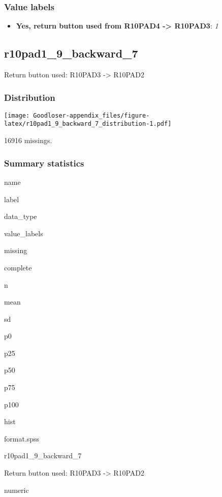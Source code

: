 \documentclass[]{book}
\providecommand{\tightlist}{%
  \setlength{\itemsep}{0pt}\setlength{\parskip}{0pt}}
\begin{document}
\subsubsection{Value labels}\label{r10pad1_9_backward_6_labels}

\begin{itemize}
\tightlist
\item
  \textbf{Yes, return button used from R10PAD4 -\textgreater{} R10PAD3}:
  \emph{1}
\end{itemize}

\subsection{r10pad1\_9\_backward\_7}\label{r10pad1_9_backward_7}

Return button used: R10PAD3 -\textgreater{} R10PAD2

\subsubsection{Distribution}\label{r10pad1_9_backward_7_distribution}

\texttt{[image: Goodloser-appendix\_files/figure-latex/r10pad1\_9\_backward\_7\_distribution-1.pdf]}

16916 missings.

\subsubsection{Summary statistics}\label{r10pad1_9_backward_7_summary}

name

label

data\_type

value\_labels

missing

complete

n

mean

sd

p0

p25

p50

p75

p100

hist

format.spss

r10pad1\_9\_backward\_7

Return button used: R10PAD3 -\textgreater{} R10PAD2

numeric
\end{document}
